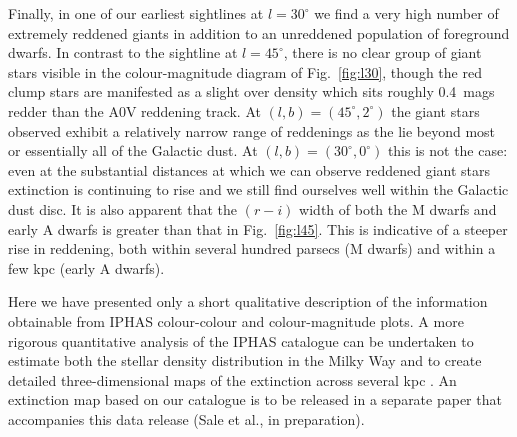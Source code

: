 \documentclass[useAMS,usenatbib]{mn2e}
\begin{document}
Finally, in one of our earliest sightlines at $l=30^{\circ}$
we find a very high number of extremely reddened giants
in addition to an unreddened population
of foreground dwarfs.
In contrast to the sightline at $l=45^{\circ}$,
there is no clear group of giant stars visible in the colour-magnitude diagram of Fig.~\ref{fig:l30},
though the red clump stars are manifested as a slight over density which sits roughly 0.4~mags redder than the A0V reddening track.
At $(l,b)=(45^{\circ}, 2^{\circ})$ the giant stars observed exhibit a relatively narrow range of reddenings as the lie beyond most or essentially all of the Galactic dust.
At $(l,b)=(30^{\circ}, 0^{\circ})$ this is not the case:
even at the substantial distances at which we can observe reddened giant stars extinction is continuing to rise and we still find ourselves well within the Galactic dust disc.
It is also apparent that the $(r-i)$ width of both the M dwarfs and early A dwarfs is greater than that in Fig.~\ref{fig:l45}.
This is indicative of a steeper rise in reddening,
both within several hundred parsecs (M dwarfs)
and within a few kpc (early A dwarfs).

Here we have presented only a short qualitative description of the information obtainable from IPHAS colour-colour and colour-magnitude plots.
A more rigorous quantitative analysis of the IPHAS catalogue
can be undertaken to estimate both the stellar density distribution in the Milky Way \citep{Sale2010}
and to create detailed three-dimensional maps of the extinction across several kpc \citep{Sale2009,Sale2012}.
An extinction map based on our catalogue is to be released in a separate paper
that accompanies this data release (Sale et al., in preparation).
\end{document}
